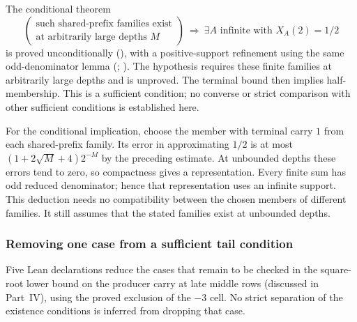 \begin{obs}
The conditional theorem
\[
\left(\begin{gathered}\text{such shared-prefix families exist}\\\text{at arbitrarily large depths }M\end{gathered}\right)
\ \Longrightarrow\ \exists A\text{ infinite with }X_{A}(2)=1/2
\]
is proved unconditionally
(),
with a positive-support refinement using the same odd-denominator lemma
(;
).
The hypothesis requires these finite families at arbitrarily large
depths and is unproved.  The terminal bound then implies half-membership.
This is a sufficient condition; no converse or strict comparison with
other sufficient conditions is established here.
\end{obs}

For the conditional implication, choose the member with terminal carry
$1$ from each shared-prefix family. Its error in approximating $1/2$
is at most $(1+2\sqrt M+4)2^{-M}$ by the preceding estimate.
At unbounded depths these errors tend to zero, so compactness gives a
representation. Every finite sum has odd reduced denominator; hence
that representation uses an infinite support. This deduction needs no
compatibility between the chosen members of different families. It
still assumes that the stated families exist at unbounded depths.

\subsubsection{Removing one case from a sufficient tail condition}

Five Lean declarations reduce the cases that remain to be checked in the
square-root lower bound on the producer carry at late middle rows (discussed in
Part~IV), using the proved exclusion of the $-3$ cell.  No strict separation of the
existence conditions is inferred from dropping that case.

